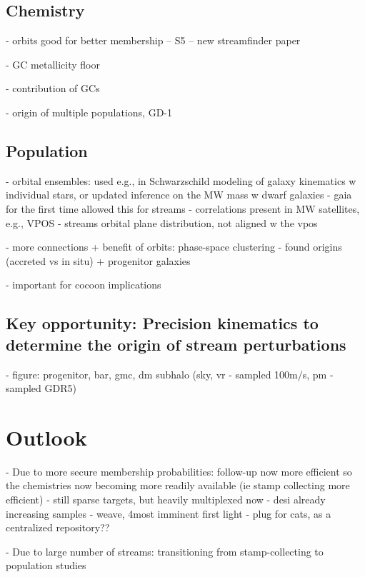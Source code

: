 \documentclass[final,5p,times,twocolumn,authoryear]{elsarticle}
\begin{document}
\subsection{Chemistry}
- orbits good for better membership
-- S5 \citep{li:2022}
-- new streamfinder paper

- GC metallicity floor

- contribution of GCs

- origin of multiple populations, GD-1


\subsection{Population}
- orbital ensembles: used e.g., in Schwarzschild modeling of galaxy kinematics w individual stars, or updated inference on the MW mass w dwarf galaxies
- gaia for the first time allowed this for streams
- correlations present in MW satellites, e.g., VPOS
- streams orbital plane distribution, not aligned w the vpos \citep{riley:2020}

- more connections + benefit of orbits: phase-space clustering \citep{bonaca:2021}
- found origins (accreted vs in situ) + progenitor galaxies

- important for cocoon implications


\subsection{Key opportunity: Precision kinematics to determine the origin of stream perturbations}
- figure: progenitor, bar, gmc, dm subhalo (sky, vr - sampled 100m/s, pm - sampled GDR5)



\section{Outlook}
\label{sec:outlook}
- Due to more secure membership probabilities: follow-up now more efficient so the chemistries now becoming more readily available (ie stamp collecting more efficient)
- still sparse targets, but heavily multiplexed now
- desi already increasing samples
- weave, 4most imminent first light
- plug for cats, as a centralized repository??

- Due to large number of streams: transitioning from stamp-collecting to population studies
\end{document}
